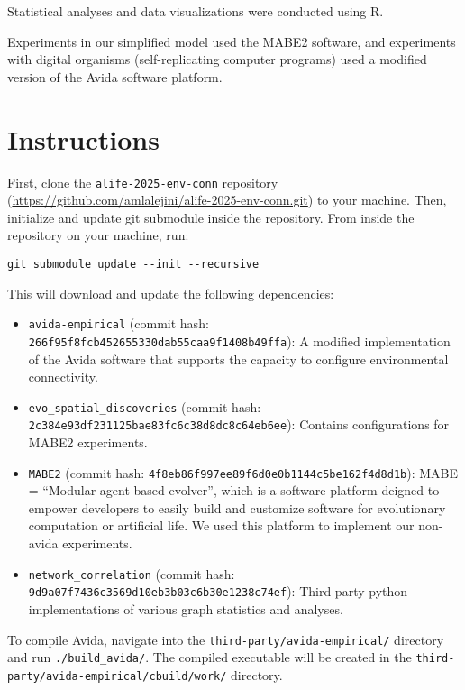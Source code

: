 \documentclass[
]{book}
\providecommand{\tightlist}{%
  \setlength{\itemsep}{0pt}\setlength{\parskip}{0pt}}
\begin{document}
Statistical analyses and data visualizations were conducted using R.

Experiments in our simplified model used the MABE2 software, and experiments with digital organisms (self-replicating computer programs) used a modified version of the Avida software platform.

\hypertarget{instructions}{%
\section{Instructions}\label{instructions}}

First, clone the \texttt{alife-2025-env-conn} repository (\url{https://github.com/amlalejini/alife-2025-env-conn.git}) to your machine.
Then, initialize and update git submodule inside the repository.
From inside the repository on your machine, run:

\begin{verbatim}
git submodule update --init --recursive
\end{verbatim}

This will download and update the following dependencies:

\begin{itemize}
\tightlist
\item
  \texttt{avida-empirical} (commit hash: \texttt{266f95f8fcb452655330dab55caa9f1408b49ffa}): A modified implementation of the Avida software that supports the capacity to configure environmental connectivity.
\item
  \texttt{evo\_spatial\_discoveries} (commit hash: \texttt{2c384e93df231125bae83fc6c38d8dc8c64eb6ee}): Contains configurations for MABE2 experiments.
\item
  \texttt{MABE2} (commit hash: \texttt{4f8eb86f997ee89f6d0e0b1144c5be162f4d8d1b}): MABE = ``Modular agent-based evolver'', which is a software platform deigned to empower developers to easily build and customize software for evolutionary computation or artificial life. We used this platform to implement our non-avida experiments.
\item
  \texttt{network\_correlation} (commit hash: \texttt{9d9a07f7436c3569d10eb3b03c6b30e1238c74ef}): Third-party python implementations of various graph statistics and analyses.
\end{itemize}

To compile Avida, navigate into the \texttt{third-party/avida-empirical/} directory and run \texttt{./build\_avida/}.
The compiled executable will be created in the \texttt{third-party/avida-empirical/cbuild/work/} directory.
\end{document}
